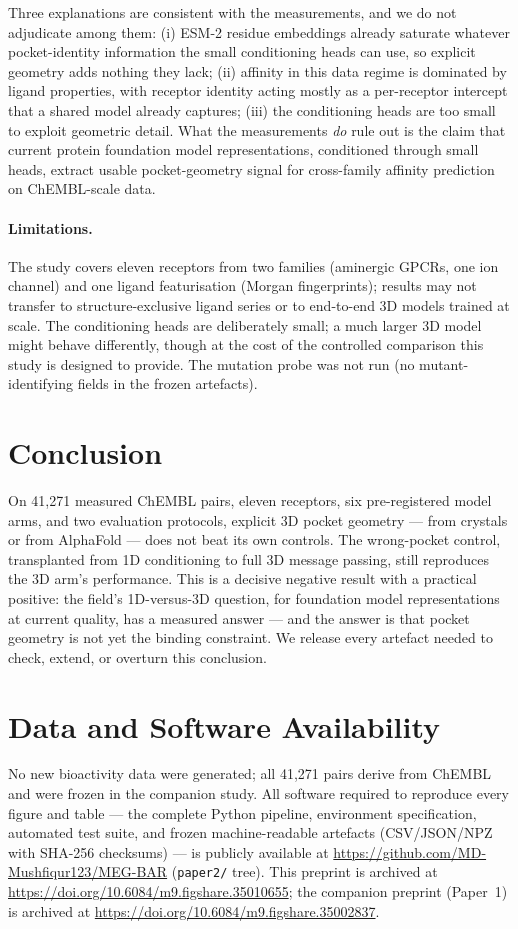 \documentclass[11pt]{article}
\begin{document}
Three explanations are consistent with the measurements, and we do not
adjudicate among them: (i) ESM-2 residue embeddings already saturate
whatever pocket-identity information the small conditioning heads can
use, so explicit geometry adds nothing they lack; (ii) affinity in this
data regime is dominated by ligand properties, with receptor identity
acting mostly as a per-receptor intercept that a shared model already
captures; (iii) the conditioning heads are too small to exploit
geometric detail. What the measurements \emph{do} rule out is the claim
that current protein foundation model representations, conditioned
through small heads, extract usable pocket-geometry signal for
cross-family affinity prediction on ChEMBL-scale data.

\paragraph{Limitations.} The study covers eleven receptors from two
families (aminergic GPCRs, one ion channel) and one ligand featurisation
(Morgan fingerprints); results may not transfer to structure-exclusive
ligand series or to end-to-end 3D models trained at scale. The
conditioning heads are deliberately small; a much larger 3D model might
behave differently, though at the cost of the controlled comparison this
study is designed to provide. The mutation probe was not run (no
mutant-identifying fields in the frozen artefacts).

\section{Conclusion}

On 41{,}271 measured ChEMBL pairs, eleven receptors, six pre-registered
model arms, and two evaluation protocols, explicit 3D pocket geometry
--- from crystals or from AlphaFold --- does not beat its own controls.
The wrong-pocket control, transplanted from 1D conditioning to full 3D
message passing, still reproduces the 3D arm's performance. This is a
decisive negative result with a practical positive: the field's
1D-versus-3D question, for foundation model representations at current
quality, has a measured answer --- and the answer is that pocket
geometry is not yet the binding constraint. We release every artefact
needed to check, extend, or overturn this conclusion.

\section*{Data and Software Availability}
No new bioactivity data were generated; all 41{,}271 pairs derive from
ChEMBL and were frozen in the companion study. All software required to
reproduce every figure and table --- the complete Python pipeline,
environment specification, automated test suite, and frozen
machine-readable artefacts (CSV/JSON/NPZ with SHA-256 checksums) --- is
publicly available at \url{https://github.com/MD-Mushfiqur123/MEG-BAR}
(\texttt{paper2/} tree). This preprint is archived at
\url{https://doi.org/10.6084/m9.figshare.35010655}; the companion
preprint (Paper~1) is archived at
\url{https://doi.org/10.6084/m9.figshare.35002837}.
\end{document}
